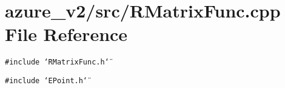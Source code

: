 \section{azure\_\-v2/src/RMatrix\-Func.cpp File Reference}
\label{RMatrixFunc_8cpp}
{\tt \#include \char`\"{}RMatrix\-Func.h\char`\"{}}\par
{\tt \#include \char`\"{}EPoint.h\char`\"{}}\par
